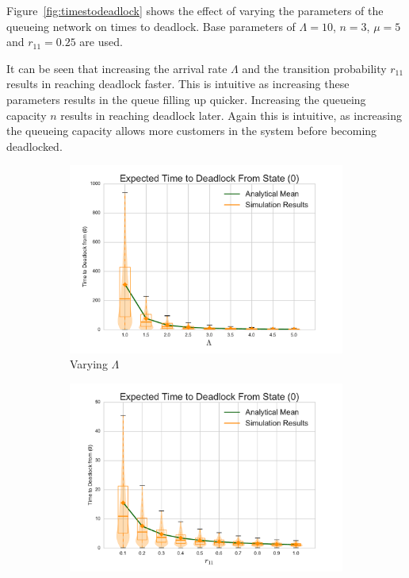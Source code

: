 \documentclass{article}
\numberwithin{equation}{section}
\begin{document}
Figure~\ref{fig:timestodeadlock} shows the effect of varying the parameters of the queueing network on times to deadlock.
Base parameters of $\Lambda = 10$, $n = 3$, $\mu = 5$ and $r_{11} = 0.25$ are used.

It can be seen that increasing the arrival rate $\Lambda$ and the transition probability $r_{11}$ results in reaching deadlock faster.
This is intuitive as increasing these parameters results in the queue filling up quicker.
Increasing the queueing capacity $n$ results in reaching deadlock later.
Again this is intuitive, as increasing the queueing capacity allows more customers in the system before becoming deadlocked.


\begin{figure}[!htbp]
\begin{center}
\begin{subfigure}[b]{0.35\textwidth}
  \includegraphics[width=\textwidth]{images/varyL}
  \caption{Varying $\Lambda$}
  \label{fig:timestodeadlock_L}
\end{subfigure}
\begin{subfigure}[b]{0.35\textwidth}
  \includegraphics[width=\textwidth]{images/varyr11}

\end{subfigure}
\end{center}
\end{figure}
\end{document}
